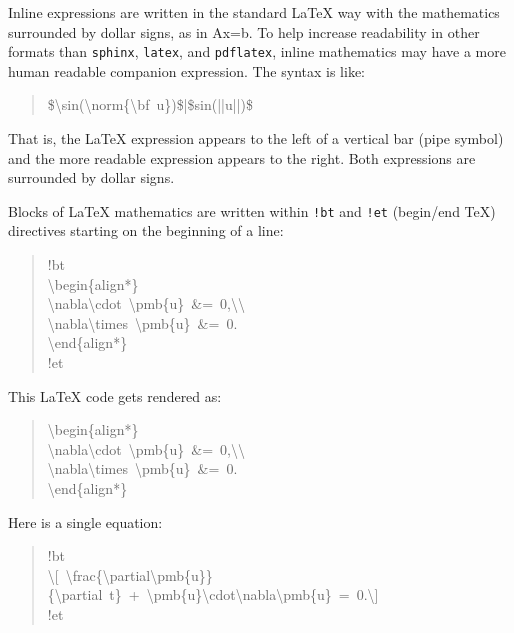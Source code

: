 \documentclass[a4paper]{article}
\begin{document}
Inline expressions are written in the standard
LaTeX way with the mathematics surrounded by dollar signs, as in
Ax=b. To help increase readability in other formats than \texttt{sphinx},
\texttt{latex}, and \texttt{pdflatex}, inline mathematics may have a more human
readable companion expression. The syntax is like:
%
\begin{quote}{\ttfamily \raggedright \noindent
\$\textbackslash{}sin(\textbackslash{}norm\{\textbackslash{}bf~u\})\$|\$sin(||u||)\$
}
\end{quote}

That is, the LaTeX expression appears to the left of a vertical bar (pipe
symbol) and the more readable expression appears to the right. Both
expressions are surrounded by dollar signs.

Blocks of LaTeX mathematics are written within
\texttt{!bt}
and
\texttt{!et} (begin/end TeX) directives starting on the beginning of a line:
%
\begin{quote}{\ttfamily \raggedright \noindent
!bt\\
\textbackslash{}begin\{align*\}\\
\textbackslash{}nabla\textbackslash{}cdot~\textbackslash{}pmb\{u\}~\&=~0,\textbackslash{}\textbackslash{}\\
\textbackslash{}nabla\textbackslash{}times~\textbackslash{}pmb\{u\}~\&=~0.\\
\textbackslash{}end\{align*\}\\
!et
}
\end{quote}

This LaTeX code gets rendered as:
%
\begin{quote}{\ttfamily \raggedright \noindent
\textbackslash{}begin\{align*\}\\
\textbackslash{}nabla\textbackslash{}cdot~\textbackslash{}pmb\{u\}~\&=~0,\textbackslash{}\textbackslash{}\\
\textbackslash{}nabla\textbackslash{}times~\textbackslash{}pmb\{u\}~\&=~0.\\
\textbackslash{}end\{align*\}
}
\end{quote}

Here is a single equation:
%
\begin{quote}{\ttfamily \raggedright \noindent
!bt\\
\textbackslash{}{[}~\textbackslash{}frac\{\textbackslash{}partial\textbackslash{}pmb\{u\}\}\{\textbackslash{}partial~t\}~+~\textbackslash{}pmb\{u\}\textbackslash{}cdot\textbackslash{}nabla\textbackslash{}pmb\{u\}~=~0.\textbackslash{}{]}\\
!et
}
\end{quote}
\end{document}

